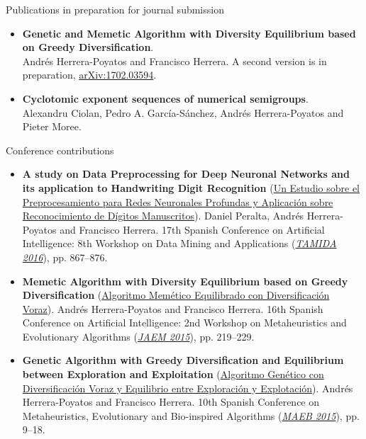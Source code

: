 \documentclass[10pt,a4paper,sans]{moderncv} %
\begin{document}
{\large \textcolor{color1}{Publications in preparation for journal submission}}

	\begin{itemize}
		\item \textbf{Genetic and Memetic Algorithm with Diversity Equilibrium based on Greedy Diversification}. \\ Andr\'es Herrera-Poyatos and Francisco Herrera.
          	A second version is in preparation, \textcolor{colorl}{\href{https://arxiv.org/abs/1702.03594}{arXiv:1702.03594}}.
		\item \textbf{Cyclotomic exponent sequences of numerical semigroups}.\\ Alexandru Ciolan, Pedro A. Garc\'ia-S\'anchez, Andr\'es Herrera-Poyatos and Pieter Moree. %
		\end{itemize}

{\large \textcolor{color1}{Conference contributions}}

	\begin{itemize}
		\item \textbf{A study on Data Preprocessing for Deep Neuronal Networks and its application to Handwriting Digit Recognition} (\textcolor{colorl}{\href{https://www.researchgate.net/publication/308901913_Un_Estudio_sobre_el_Preprocesamiento_para_Redes_Neuronales_Profundas_y_Aplicacion_sobre_Reconocimiento_de_Digitos_Manuscritos}{Un Estudio sobre el Preprocesamiento para Redes Neuronales Profundas y Aplicación sobre Reconocimiento de Dígitos Manuscritos}}). Daniel Peralta, Andrés Herrera-Poyatos and Francisco Herrera. 17th Spanish Conference on Artificial Intelligence: 8th Workshop on Data Mining and Applications (\textcolor{colorl}{\textit{\href{http://www.congresocedi.es/en/tamida}{TAMIDA 2016}}}), pp. 867--876.
		\item \textbf{Memetic Algorithm with Diversity Equilibrium based on Greedy Diversification} (\textcolor{colorl}{\href{https://www.researchgate.net/publication/320701097_Algoritmo_Memetico_Equilibrado_con_Diversificacion_Voraz}{Algoritmo Memético Equilibrado con Diversificación Voraz}}). Andrés Herrera-Poyatos and Francisco Herrera. 16th Spanish Conference on Artificial Intelligence: 2nd Workshop on Metaheuristics and Evolutionary Algorithms (\textcolor{colorl}{\textit{\href{http://simd.albacete.org/caepia15/en/conference/jaem15/}{JAEM 2015}}}), pp. 219--229.
		\item  \textbf{Genetic Algorithm with Greedy Diversification and Equilibrium between Exploration and Exploitation} (\textcolor{colorl}{\href{https://www.researchgate.net/publication/320701127_Algoritmo_Genetico_con_Diversificacion_Voraz_y_Equilibrio_entre_Exploracion_y_Explotacion}{Algoritmo Genético con Diversificación Voraz y Equilibrio entre Exploración y Explotación}}). Andrés Herrera-Poyatos and Francisco Herrera. 10th Spanish Conference on Metaheuristics, Evolutionary and Bio-inspired Algorithms (\textcolor{colorl}{\textit{\href{http://www.eweb.unex.es/eweb/maeb2015/}{MAEB 2015}}}), pp. 9--18.
	\end{itemize}
\end{document}
